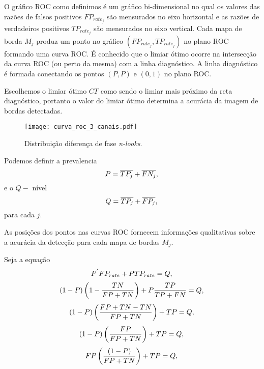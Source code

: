 O gráfico ROC como definimos é um gráfico bi-dimensional no qual os valores das razões de falsos positivos $FP_{rate_j}$ são mensurados no eixo horizontal e as razões de verdadeiros positivos $TP_{rate_j}$ são mensurados no eixo vertical. Cada mapa de borda $M_j$ produz um ponto no gráfico $(FP_{rate_j}, TP_{rate_j})$ no plano ROC formando uma curva ROC. É conhecido que o limiar ótimo ocorre na intersecção da curva ROC (ou perto da mesma) com a linha diagnóstico. A linha diagnóstico é formada conectando os pontos $(P,P)$ e $(0,1)$ no plano ROC. 

Escolhemos o limiar ótimo $CT$ como sendo o limiar mais próximo da reta diagnóstico, 
portanto o valor do limiar ótimo  determina a acurácia da imagem de bordas detectadas. 

\begin{figure}[hbt]
\centering
\texttt{[image: curva\_roc\_3\_canais.pdf]}
	\caption{Distribuição diferença de fase {\it n-looks}.}
\label{cap_fusao_fig03}
\end{figure}

Podemos definir a prevalencia
\begin{equation}\label{cap_fusao_25}
	P =\overline{TP_j}+\overline{FN_j}, \\
\end{equation}
e o $Q-$ nível
\begin{equation}\label{cap_fusao_26}
	Q =\overline{TP_j}+\overline{FP_j}, \\
\end{equation}
para cada $j$.


As posições dos pontos nas curvas ROC fornecem informações qualitativas sobre a acurácia da detecção para cada mapa de bordas $M_j$. 

Seja a equação
\begin{equation}\label{cap_fusao_27}
     P^{'}FP_{rate}+P TP_{rate} = Q, \\
\end{equation}
\begin{equation}\label{cap_fusao_28}
     (1-P)\left(1-\frac{TN}{FP+TN}\right)+P \frac{TP}{TP+FN} = Q, \\
\end{equation}
\begin{equation}\label{cap_fusao_29}
     (1-P) \left(\frac{FP+TN-TN}{FP+TN}\right)+TP = Q, \\
\end{equation}
\begin{equation}\label{cap_fusao_30}
     (1-P) \left(\frac{FP}{FP+TN}\right)+TP = Q, \\
\end{equation}
\begin{equation}\label{cap_fusao_31}
      FP\left(\frac{(1-P)}{FP+TN}\right)+TP = Q, \\
\end{equation}

